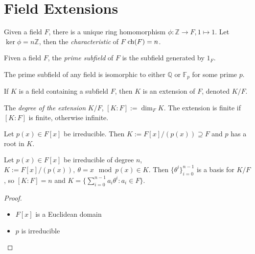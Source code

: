 \documentclass[a4paper]{article}
\begin{document}
\maketitle

\tableofcontents

\section{Field Extensions}

\begin{defi}
  Given a field $F$, there is a unique ring homomorphism $\phi: \mathbb{Z} \rightarrow F, 1 \mapsto 1$. Let $\ker \phi = n\mathbb{Z}$, then the \emph{characteristic} of $F$ $\operatorname{ch}(F) = n$.
\end{defi}

\begin{defi}
  Fiven a field $F$, the \emph{prime subfield} of $F$ is the subfield generated by $1_F$.
\end{defi}

The prime subfield of any field is isomorphic to either $\mathbb{Q}$ or $\mathbb{F}_p$ for some prime $p$.

\begin{defi}
  If $K$ is a field containing a subfield $F$, then $K$ is an extension of $F$, denoted $K/F$.
\end{defi}

\begin{defi}
  The \emph{degree of the extension} $K/F$, $[K:F] := \dim_FK$. The extension is finite if $[K:F]$ is finite, otherwise infinite.
\end{defi}

\begin{prop}
  Let $p(x) \in F[x]$ be irreducible. Then $K:=F[x]/(p(x))\supseteq F$ and $p$ has a root in $K$.
\end{prop}

\begin{prop}
  Let $p(x) \in F[x]$ be irreducible of degree $n$, $K:=F[x]/(p(x)),\: \theta= x \mod{p(x)} \in K$. Then $\{\theta^i\}_{i=0}^{n-1}$ is a basis for $K/F$, so $[K:F]=n$ and $K=\{\sum_{i=0}^{n-1} a_i \theta^i:a_i \in F\}$.
\end{prop}

\begin{proof}\leavevmode
  \begin{itemize}
  \item $F[x]$ is a Euclidean domain
  \item $p$ is irreducible
  \end{itemize}
\end{proof}
\end{document}
